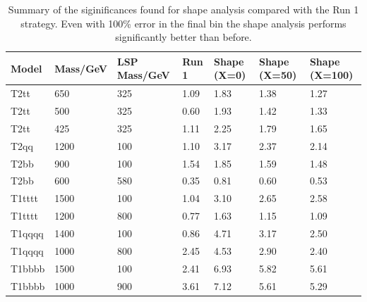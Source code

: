 \begin{table}[!h]
  \label{table:syst}
  \caption{Summary of the siginificances found for shape analysis compared
    with the Run 1 strategy. Even with 100\% error in the final bin
  the shape analysis performs significantly better than before.}
  \centering
  \footnotesize
  \begin{tabular}{ l | l | l | l | l | l | l }
    Model & Mass/GeV & LSP Mass/GeV & Run 1 & Shape (X=0) & Shape (X=50) & Shape (X=100) \\ \hline
    T2tt & 650 & 325      & 1.09& 1.83& 1.38& 1.27\\ 
    T2tt & 500 & 325      & 0.60& 1.93& 1.42& 1.33\\ 
    T2tt & 425 & 325      & 1.11& 2.25& 1.79& 1.65\\ 
    T2qq & 1200 & 100      & 1.10& 3.17& 2.37& 2.14\\
    T2bb & 900 & 100      & 1.54& 1.85& 1.59& 1.48\\ 
    T2bb & 600 & 580      & 0.35& 0.81& 0.60& 0.53\\ 
    T1tttt & 1500 & 100    & 1.04& 3.10& 2.65& 2.58\\
    T1tttt & 1200 & 800    & 0.77& 1.63& 1.15& 1.09\\
    T1qqqq & 1400 & 100    & 0.86& 4.71& 3.17& 2.50\\
    T1qqqq & 1000 & 800    & 2.45& 4.53& 2.90& 2.40\\
    T1bbbb & 1500 & 100    & 2.41& 6.93& 5.82& 5.61\\
    T1bbbb & 1000 & 900    & 3.61& 7.12& 5.61& 5.29\\
  \end{tabular}
\end{table}

